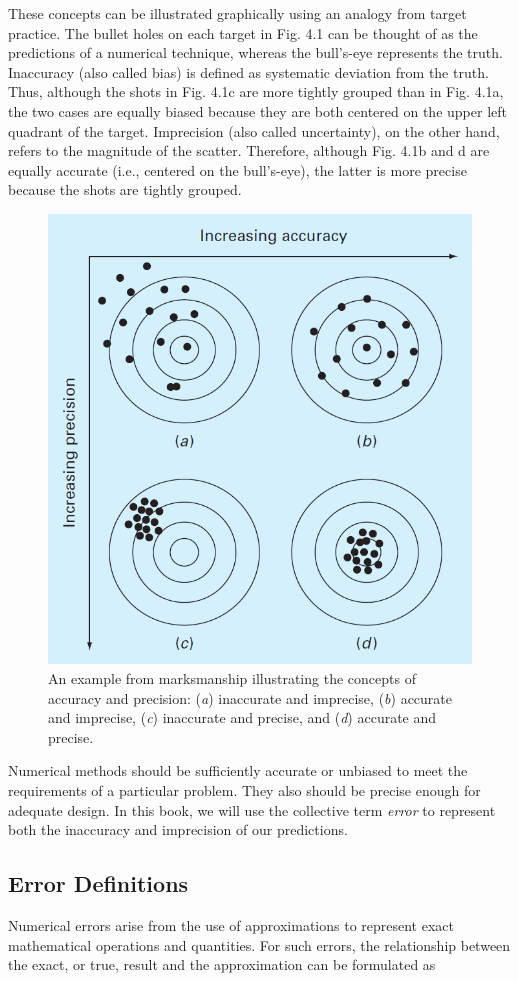 \documentclass[../main.tex]{subfiles}
\begin{document}
These concepts can be illustrated graphically using an analogy from target practice.
The bullet holes on each target in Fig. 4.1 can be thought of as the predictions of a numerical
technique, whereas the bull's-eye represents the truth. Inaccuracy (also called bias) is
defined as systematic deviation from the truth. Thus, although the shots in Fig. 4.1c are
more tightly grouped than in Fig. 4.1a, the two cases are equally biased because they are
both centered on the upper left quadrant of the target. Imprecision (also called uncertainty),
on the other hand, refers to the magnitude of the scatter. Therefore, although Fig. 4.1b and
d are equally accurate (i.e., centered on the bull's-eye), the latter is more precise because
the shots are tightly grouped.

\begin{figure}[h]
    \includegraphics[width=0.55\linewidth]{./images/fig_4_1.png}    
    \caption{An example from marksmanship illustrating the concepts of accuracy and precision:
    (\emph{a}) inaccurate and imprecise, (\emph{b}) accurate and imprecise, (\emph{c}) inaccurate and precise,
    and (\emph{d}) accurate and precise.}
\end{figure}

\bigskip
Numerical methods should be sufficiently accurate or unbiased to meet the requirements
of a particular problem. They also should be precise enough for adequate design.
In this book, we will use the collective term \emph{error} to represent both the inaccuracy and
imprecision of our predictions.

\subsection{Error Definitions}
\noindent
Numerical errors arise from the use of approximations to represent exact mathematical operations
and quantities. For such errors, the relationship between the exact, or true, result
and the approximation can be formulated as
\newline
\end{document}
